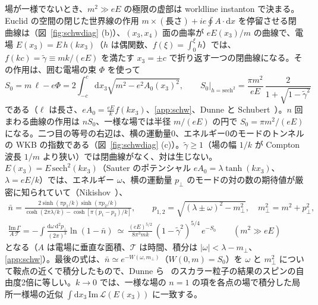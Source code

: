 \documentclass[a4paper,10pt]{ltjsarticle}
\newcommand{\dd}{\mathrm{d}}
\begin{document}
場が一様でないとき、$m^2\gg eE$ の極限の虚部は worldline instanton で決まる。Euclid の空間の閉じた世界線の作用 $m\times(\text{長さ})+ie\oint A\cdot\dd x$ を停留させる閉曲線は（図~\ref{fig:schwdiag} (b)）、$(x_3,x_4)$ 面の曲率が $eE(x_3)/m$ の曲線で、電場 $E(x_3)=E\,h(kx_3)$（$h$ は偶関数、$f(\xi)=\int_0^\xi h$）では、$f(kc)=\tilde\gamma\equiv mk/(eE)$ を満たす $x_3=\pm c$ で折り返す一つの閉曲線になる。その作用は、囲む電場の束 $\Phi$ を使って
\begin{equation}
S_0=m\,\ell-e\Phi=2\int_{-c}^{c}\dd x_3\sqrt{m^2-e^2A_0(x_3)^2},\qquad
S_0\big|_{h=\mathrm{sech}^2}=\frac{\pi m^2}{eE}\,\frac{2}{1+\sqrt{1-\tilde\gamma^2}}
\label{eq:wli}
\end{equation}
である（$\ell$ は長さ、$eA_0=\frac{eE}{k}f(kx_3)$、\ref{app:schw}、Dunne と Schubert~\cite{ds05}）。$n$ 回まわる曲線の作用は $nS_0$、一様な場では半径 $m/(eE)$ の円で $S_0=\pi m^2/(eE)$ になる。二つ目の等号の右辺は、横の運動量0、エネルギー0のモードのトンネルの WKB の指数である（図~\ref{fig:schwdiag} (c)）。$\tilde\gamma\ge1$（場の幅 $1/k$ が Compton 波長 $1/m$ より狭い）では閉曲線がなく、対は生じない。$E(x_3)=E\,\mathrm{sech}^2(kx_3)$（Sauter のポテンシャル $eA_0=\lambda\tanh(kx_3)$、$\lambda=eE/k$）では、エネルギー $\omega$、横の運動量 $p_\perp$ のモードの対の数の期待値が厳密に知られていて（Nikishov~\cite{nikishov70}）、
\begin{equation}
\begin{gathered}
\bar n=\frac{2\sinh(\pi p_1/k)\sinh(\pi p_2/k)}{\cosh(2\pi\lambda/k)-\cosh[\pi(p_1-p_2)/k]},\qquad p_{1,2}=\sqrt{(\lambda\pm\omega)^2-m_\perp^2},\quad m_\perp^2=m^2+p_\perp^2,\\
\frac{\mathrm{Im}\,\Gamma}{A\,\mathcal T}=-\int\frac{\dd\omega\,\dd^2p_\perp}{(2\pi)^3}\ln(1-\bar n)\ \simeq\ \frac{(eE)^{5/2}}{8\pi^3mk}\,(1-\tilde\gamma^2)^{5/4}\,e^{-S_0}\qquad(m^2\gg eE)
\end{gathered}
\label{eq:sauter}
\end{equation}
となる（$A$ は電場に垂直な面積、$\mathcal T$ は時間、積分は $|\omega|<\lambda-m_\perp$、\ref{app:schw}）。最後の式は、$\bar n\simeq e^{-W(\omega,m_\perp)}$（$W(0,m)=S_0$）を $\omega$ と $m_\perp^2$ について鞍点の近くで積分したもので、Dunne ら~\cite{dwgs06} のスカラー粒子の結果のスピンの自由度2倍に等しい。$k\to0$ では、一様な場の $n=1$ の項を各点の場で積分した局所一様場の近似 $\int\dd x_3\,\mathrm{Im}\,\mathcal L(E(x_3))$ に一致する。
\end{document}
